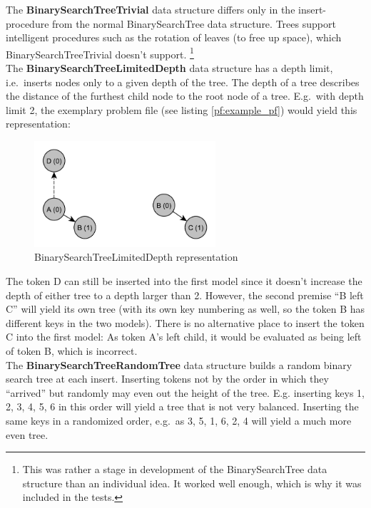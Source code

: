\documentclass[hidelinks]{scrartcl}
\begin{document}
The \textbf{BinarySearchTreeTrivial} data structure differs only in the insert-procedure from the normal BinarySearchTree data structure. Trees support intelligent procedures such as the rotation of leaves (to free up space), which BinarySearchTreeTrivial doesn't support. \footnote{This was rather a stage in development of the BinarySearchTree data structure than an individual idea. It worked well enough, which is why it was included in the tests.} \\

The \textbf{BinarySearchTreeLimitedDepth} data structure has a depth limit, i.e.\ inserts nodes only to a given depth of the tree. The depth of a tree describes the distance of the furthest child node to the root node of a tree. E.g.\ with depth limit 2, the exemplary problem file (see listing \ref{pf:example_pf}) would yield this representation:

\begin{figure}[H]
	\caption{BinarySearchTreeLimitedDepth representation}
	\label{img:binarysearchtreelimiteddepth_example_pf}
	\centering
	\includegraphics[width=0.6\textwidth]{Illustrations/BinarySearchTreeLimitedDepth.pdf}
\end{figure}

The token D can still be inserted into the first model since it doesn't increase the depth of either tree to a depth larger than 2. However, the second premise ``B left C'' will yield its own tree (with its own key numbering as well, so the token B has different keys in the two models). There is no alternative place to insert the token C into the first model: As token A's left child, it would be evaluated as being left of token B, which is incorrect. \\

The \textbf{BinarySearchTreeRandomTree} data structure builds a random binary search tree at each insert. Inserting tokens not by the order in which they ``arrived'' but randomly may even out the height of the tree. E.g. inserting keys 1, 2, 3, 4, 5, 6 in this order will yield a tree that is not very balanced. Inserting the same keys in a randomized order, e.g.\ as 3, 5, 1, 6, 2, 4 will yield a much more even tree.
\end{document}
